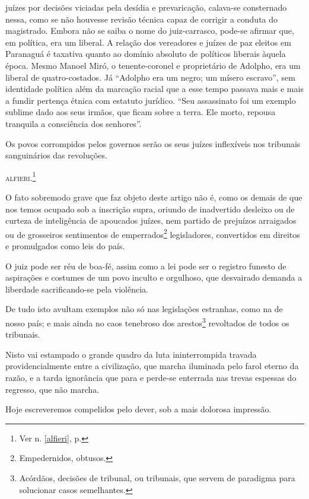 \begin{didascalia}
{juízes por decisões viciadas pela desídia e prevaricação, calava-se
consternado nessa, como se não houvesse revisão técnica capaz de
corrigir a conduta do magistrado. Embora não se saiba o nome do
juiz-carrasco, pode-se afirmar que, em política, era um liberal. A
relação dos vereadores e juízes de paz eleitos em Paranaguá é taxativa
quanto ao domínio absoluto de políticos liberais àquela época. Mesmo
Manoel Miró, o tenente-coronel e proprietário de Adolpho, era um liberal
de quatro-costados. Já ``Adolpho era um negro; um mísero escravo'', sem
identidade política além da marcação racial que a esse tempo passava
mais e mais a fundir pertença étnica com estatuto jurídico. ``Seu
assassinato foi um exemplo sublime dado aos seus irmãos, que ficam sobre
a terra. Ele morto, repousa tranquila a consciência dos senhores''.}
\end{didascalia}



Os povos corrompidos pelos governos serão os seus juízes inflexíveis nos
tribunais sanguinários das revoluções.

\textsc{alfieri}.\footnote{Ver n. \ref{alfieri}, p. \pageref{alfieri}}

O fato sobremodo grave que faz objeto deste artigo não é, como os demais
de que nos temos ocupado sob a inscrição supra, oriundo de inadvertido
desleixo ou de curteza de inteligência de apoucados juízes, nem partido
de prejuízos arraigados ou de grosseiros sentimentos de
emperrados\footnote{Empedernidos, obtusos.} legisladores, convertidos
em direitos e promulgados como leis do país.

O juiz pode ser réu de boa-fé, assim como a lei pode ser o registro
funesto de aspirações e costumes de um povo inculto e orgulhoso, que
desvairado demanda a liberdade sacrificando-se pela violência.

De tudo isto avultam exemplos não só nas legislações estranhas, como na
de nosso país; e mais ainda no caos tenebroso dos arestos\footnote{
  Acórdãos, decisões de tribunal, ou tribunais, que servem de paradigma
  para solucionar casos semelhantes.} revoltados de todos os tribunais.

Nisto vai estampado o grande quadro da luta ininterrompida travada
providencialmente entre a civilização, que marcha iluminada pelo farol
eterno da razão, e a tarda ignorância que para e perde-se enterrada nas
trevas espessas do regresso, que não marcha.

Hoje escreveremos compelidos pelo dever, sob a mais dolorosa impressão.

